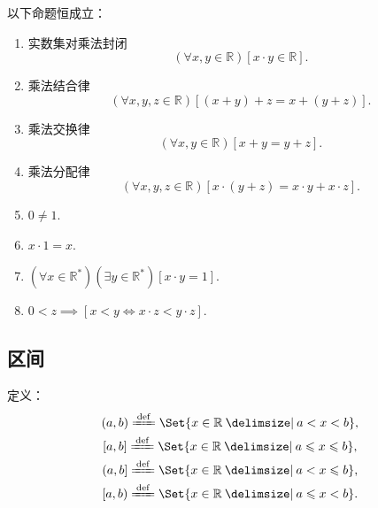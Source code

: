 \begin{theorem}
以下命题恒成立：
\begin{enumerate}
	\item 实数集对乘法封闭\begin{equation}
		(\forall x,y\in\mathbb{R})[x \cdot y \in \mathbb{R}].
	\end{equation}
	\item 乘法结合律\begin{equation}
		(\forall x,y,z\in\mathbb{R})[(x+y)+z=x+(y+z)].
	\end{equation}
	\item 乘法交换律\begin{equation}
		(\forall x,y\in\mathbb{R})[x+y=y+z].
	\end{equation}
	\item 乘法分配律\begin{equation}
		(\forall x,y,z\in\mathbb{R})[x\cdot(y+z)=x \cdot y+x \cdot z].
	\end{equation}
	\item \(0\neq1\).
	\item \(x\cdot1=x\).
	\item \((\forall x\in\mathbb{R}^*)(\exists y\in\mathbb{R}^*)[x \cdot y=1]\).
	\item \(0<z \implies [x<y \iff x \cdot z<y \cdot z]\).
\end{enumerate}
\end{theorem}

\subsection{区间}
定义：\begin{gather}
	(a,b) \defeq \Set{ x\in\mathbb{R} \given a<x<b }, \\
	[a,b] \defeq \Set{ x\in\mathbb{R} \given a \leqslant x \leqslant b }, \\
	(a,b] \defeq \Set{ x\in\mathbb{R} \given a < x \leqslant b }, \\
	[a,b) \defeq \Set{ x\in\mathbb{R} \given a \leqslant x < b }.
\end{gather}
